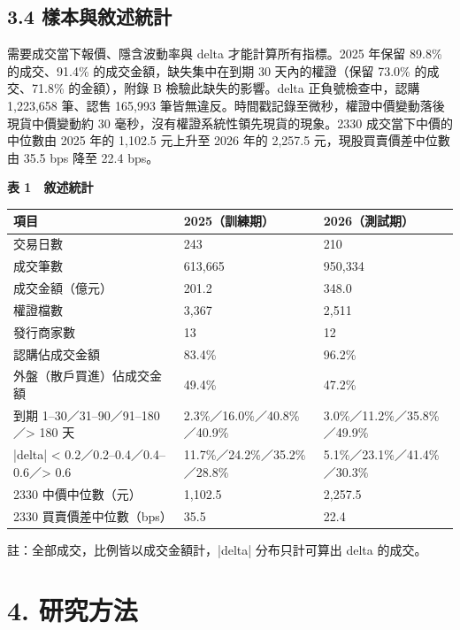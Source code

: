 \documentclass[12pt,a4paper]{article}
\begin{document}
\subsection*{3.4 樣本與敘述統計}

需要成交當下報價、隱含波動率與 delta 才能計算所有指標。2025 年保留 89.8\% 的成交、91.4\% 的成交金額，缺失集中在到期 30 天內的權證（保留 73.0\% 的成交、71.8\% 的金額），附錄 B 檢驗此缺失的影響。delta 正負號檢查中，認購 1,223,658 筆、認售 165,993 筆皆無違反。時間戳記錄至微秒，權證中價變動落後現貨中價變動約 30 毫秒，沒有權證系統性領先現貨的現象。2330 成交當下中價的中位數由 2025 年的 1,102.5 元上升至 2026 年的 2,257.5 元，現股買賣價差中位數由 35.5 bps 降至 22.4 bps。

\begin{center}\textbf{表 1　敘述統計}\end{center}\vspace{-0.8em}

\begin{center}\small
\begin{tabularx}{\linewidth}{YYY}
\toprule
\textbf{項目} & \textbf{2025（訓練期）} & \textbf{2026（測試期）} \\
\midrule
交易日數 & 243 & 210 \\
成交筆數 & 613,665 & 950,334 \\
成交金額（億元） & 201.2 & 348.0 \\
權證檔數 & 3,367 & 2,511 \\
發行商家數 & 13 & 12 \\
認購佔成交金額 & 83.4\% & 96.2\% \\
外盤（散戶買進）佔成交金額 & 49.4\% & 47.2\% \\
到期 1–30／31–90／91–180／> 180 天 & 2.3\%／16.0\%／40.8\%／40.9\% & 3.0\%／11.2\%／35.8\%／49.9\% \\
|delta| < 0.2／0.2–0.4／0.4–0.6／> 0.6 & 11.7\%／24.2\%／35.2\%／28.8\% & 5.1\%／23.1\%／41.4\%／30.3\% \\
2330 中價中位數（元） & 1,102.5 & 2,257.5 \\
2330 買賣價差中位數（bps） & 35.5 & 22.4 \\
\bottomrule
\end{tabularx}
\end{center}

{\small\noindent 註：全部成交，比例皆以成交金額計，|delta| 分布只計可算出 delta 的成交。\par}


\section*{4. 研究方法}
\end{document}

